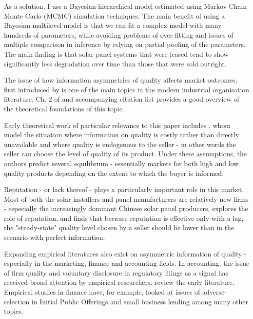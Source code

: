 \documentclass[12pt]{article}
\begin{document}
As a solution, I use a Bayesian hierarchical model estimated using Markov Chain Monte Carlo (MCMC) simulation techniques. The main benefit of using a Bayesian multilevel model is that we can fit a complex model with many hundreds of parameters, while avoiding problems of over-fitting and issues of multiple comparison in inference by relying on partial pooling of the parameters. The main finding is that solar panel systems that were leased tend to show significantly less degradation over time than those that were sold outright. 

The issue of how information asymmetries of quality affects market outcomes, first introduced by \citet{akerlof_market_1970} is one of the main topics in the modern industrial organisation literature. Ch. 2 of \citet{tirole_theory_1988} and accompanying citation list provides a good overview of the theoretical foundations of this topic. 

Early theoretical work of particular relevance to this paper includes \citet{chan_prices_1982}, whom model the situation where information on quality is costly rather than directly unavailable and where quality is endogenous to the seller - in other words the seller can choose the level of quality of its product. Under these assumptions, the authors predict several equilibrium - essentially markets for both high and low quality products depending on the extent to which the buyer is informed. 

Reputation - or lack thereof - plays a particularly important role in this market. Most of both the solar installers and panel manufacturers are relatively new firms - especially the increasingly dominant Chinese solar panel producers,  \citet{shapiro_consumer_1982} explores the role of reputation, and finds that because reputation is effective only with a lag, the "steady-state" quality level chosen by a seller should be lower than in the scenario with perfect information. 

Expanding empirical literatures also exist on asymmetric information of quality - especially in the marketing, finance and accounting fields. In accounting, the issue of firm quality and voluntary disclosure in regulatory filings as a signal has received broad attention by empirical researchers. \citet{healy_information_2001} review the early literature. Empirical studies in finance have, for example, looked at issues of adverse-selection in Initial Public Offerings \citep{michaely_pricing_1994} and small business lending \citep{petersen_benefits_1994} among many other topics.
\end{document}
